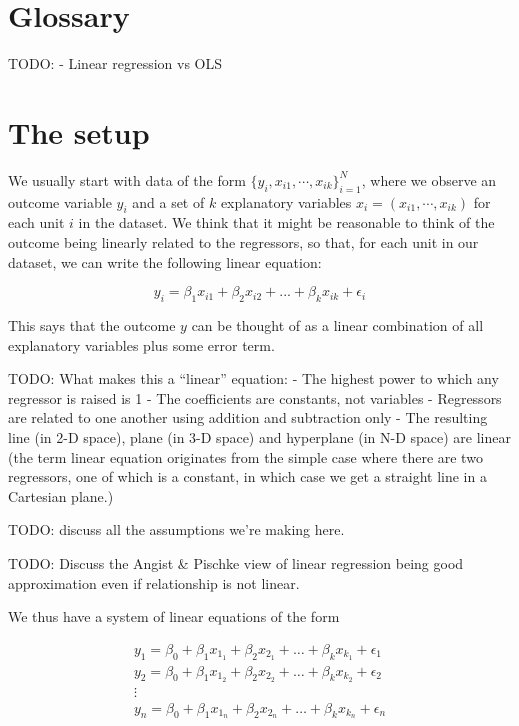 \documentclass[
  letterpaper,
  DIV=11,
  numbers=noendperiod]{scrreprt}
\begin{document}
\hypertarget{glossary}{%
\section{Glossary}\label{glossary}}

TODO: - Linear regression vs OLS

\hypertarget{the-setup}{%
\section{The setup}\label{the-setup}}

We usually start with data of the form
\(\{y_i, x_{i1}, \cdots, x_{ik}\}_{i=1}^N\), where we observe an outcome
variable \(y_i\) and a set of \(k\) explanatory variables
\(x_i = (x_{i1}, \cdots, x_{ik})\) for each unit \(i\) in the dataset.
We think that it might be reasonable to think of the outcome being
linearly related to the regressors, so that, for each unit in our
dataset, we can write the following linear equation:

\[
y_{i} = \beta_{1}x_{i1} + \beta_{2}x_{i2} + ... + \beta_{k}x_{ik} + \epsilon_{i} 
\]

This says that the outcome \(y\) can be thought of as a linear
combination of all explanatory variables plus some error term.

TODO: What makes this a ``linear'' equation: - The highest power to
which any regressor is raised is 1 - The coefficients are constants, not
variables - Regressors are related to one another using addition and
subtraction only - The resulting line (in 2-D space), plane (in 3-D
space) and hyperplane (in N-D space) are linear (the term linear
equation originates from the simple case where there are two regressors,
one of which is a constant, in which case we get a straight line in a
Cartesian plane.)

TODO: discuss all the assumptions we're making here.

TODO: Discuss the Angist \& Pischke view of linear regression being good
approximation even if relationship is not linear.

We thus have a system of linear equations of the form

\[
\begin{aligned}
y_1 = \beta_0 + \beta_1 x_{1_1} + \beta_2 x_{2_1} + \ldots + \beta_k x_{k_1} + \epsilon_1 \\
y_2 = \beta_0 + \beta_1 x_{1_2} + \beta_2 x_{2_2} + \ldots + \beta_k x_{k_2} + \epsilon_2 \\
\vdots\\
y_n = \beta_0 + \beta_1 x_{1_n} + \beta_2 x_{2_n} + \ldots + \beta_k x_{k_n} + \epsilon_n \\
\end{aligned}
\]
\end{document}
